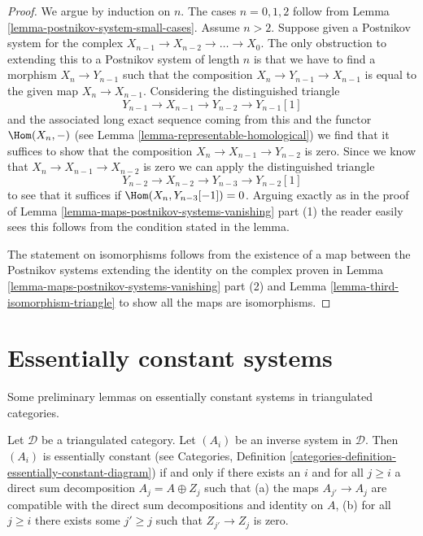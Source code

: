 \begin{proof}
We argue by induction on $n$. The cases $n = 0, 1, 2$
follow from Lemma \ref{lemma-postnikov-system-small-cases}.
Assume $n > 2$.
Suppose given a Postnikov system for the complex
$X_{n - 1} \to X_{n - 2} \to \ldots \to X_0$.
The only obstruction to extending this to a Postnikov system
of length $n$ is that we have to find a morphism
$X_n \to Y_{n - 1}$ such that the composition
$X_n \to Y_{n - 1} \to X_{n - 1}$ is equal to the given map
$X_n \to X_{n - 1}$. Considering the distinguished triangle
$$
Y_{n - 1} \to X_{n - 1} \to Y_{n - 2} \to Y_{n - 1}[1]
$$
and the associated long exact sequence coming from this
and the functor $\Hom(X_n, -)$
(see Lemma \ref{lemma-representable-homological})
we find that it suffices to show that the composition
$X_n \to X_{n - 1} \to Y_{n - 2}$ is zero.
Since we know that $X_n \to X_{n - 1} \to X_{n - 2}$ is zero
we can apply the distinguished triangle
$$
Y_{n - 2} \to X_{n - 2} \to Y_{n - 3} \to Y_{n - 2}[1]
$$
to see that it suffices if $\Hom(X_n, Y_{n - 3}[-1]) = 0$.
Arguing exactly as in the proof of
Lemma \ref{lemma-maps-postnikov-systems-vanishing} part (1)
the reader easily sees this follows from the condition
stated in the lemma.

\medskip\noindent
The statement on isomorphisms follows from the existence of a map
between the Postnikov systems extending the identity on the complex
proven in Lemma \ref{lemma-maps-postnikov-systems-vanishing} part (2)
and Lemma \ref{lemma-third-isomorphism-triangle} to show all the maps are
isomorphisms.
\end{proof}









\section{Essentially constant systems}
\label{section-essentially-constant}

\noindent
Some preliminary lemmas on essentially constant systems in triangulated
categories.

\begin{lemma}
\label{lemma-essentially-constant}
Let $\mathcal{D}$ be a triangulated category. Let $(A_i)$ be an inverse system
in $\mathcal{D}$. Then $(A_i)$ is essentially constant (see
Categories, Definition
\ref{categories-definition-essentially-constant-diagram})
if and only if there exists an $i$ and for all $j \geq i$ a direct sum
decomposition $A_j = A \oplus Z_j$ such that
(a) the maps $A_{j'} \to A_j$ are compatible with the direct sum
decompositions and identity on $A$, (b) for all $j \geq i$ there exists some
$j' \geq j$ such that $Z_{j'} \to Z_j$ is zero.
\end{lemma}

